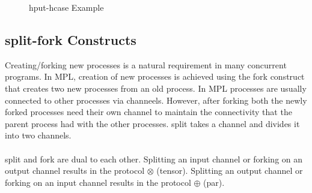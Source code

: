 \documentclass[11pt]{article}
\newcommand{\llab}[1]{\tiny{\texttt{(+)~~~}}
                      \small{$#1$}
                      \tiny{\texttt{~~~(-)}}
                     }
\newcommand{\plab}[1]{\tiny{\texttt{(+)~~~~~}}
                      \small{$#1$}
                     }
\newcommand{\proc}[2] {\small{\sf{$#1$}}\\~~\\ \tiny{{#2}}}
\newcommand{\<}{\langle}
\renewcommand{\>}{\rangle}
\begin{document}
\begin{figure}[!h]
\begin{center}
\end {center}
\caption{{\sf hput-hcase} Example} 
\label{fig:Conc_hcase_exam}
\end{figure}

\subsection {split-fork Constructs}
Creating/forking new processes is a natural requirement in many concurrent programs. In MPL, creation of new processes is achieved using the {\sf fork} construct that creates two new processes from an old process. In MPL processes are usually connected to other processes via channeels. However, after forking both the newly forked processes need their own channel to maintain the connectivity that the parent process had with the other processes. {\sf split} takes a channel and divides it into two channels. 
~~\\~~\\ 
{\sf split} and {\sf fork} are dual to each other. Splitting an input channel or forking on an output channel results in the protocol $\mathbf {\otimes}$ (tensor). Splitting an output channel or forking on an input channel results in the protocol $\mathbf {\oplus}$ (par).
\end{document}
